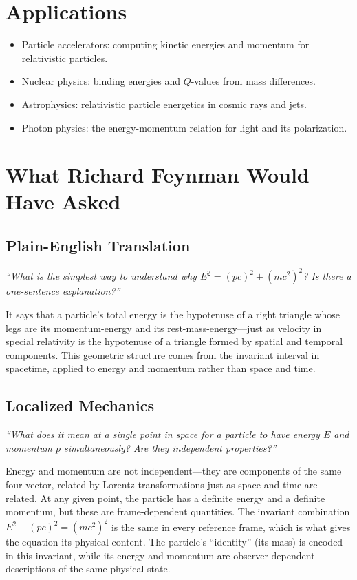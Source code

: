 \documentclass[11pt,openright]{book}
\begin{document}
\section*{Applications}

\begin{itemize}
    \item Particle accelerators: computing kinetic energies and momentum for relativistic particles.
    \item Nuclear physics: binding energies and $Q$-values from mass differences.
    \item Astrophysics: relativistic particle energetics in cosmic rays and jets.
    \item Photon physics: the energy-momentum relation for light and its polarization.
\end{itemize}
\section*{What Richard Feynman Would Have Asked}

\subsection*{Plain-English Translation}
\textit{``What is the simplest way to understand why $E^2 = (pc)^2 + (mc^2)^2$? Is there a one-sentence explanation?''}

It says that a particle's total energy is the hypotenuse of a right triangle whose legs are its momentum-energy and its rest-mass-energy---just as velocity in special relativity is the hypotenuse of a triangle formed by spatial and temporal components. This geometric structure comes from the invariant interval in spacetime, applied to energy and momentum rather than space and time.

\subsection*{Localized Mechanics}
\textit{``What does it mean at a single point in space for a particle to have energy $E$ and momentum $p$ simultaneously? Are they independent properties?''}

Energy and momentum are not independent---they are components of the same four-vector, related by Lorentz transformations just as space and time are related. At any given point, the particle has a definite energy and a definite momentum, but these are frame-dependent quantities. The invariant combination $E^2 - (pc)^2 = (mc^2)^2$ is the same in every reference frame, which is what gives the equation its physical content. The particle's ``identity'' (its mass) is encoded in this invariant, while its energy and momentum are observer-dependent descriptions of the same physical state.
\end{document}
